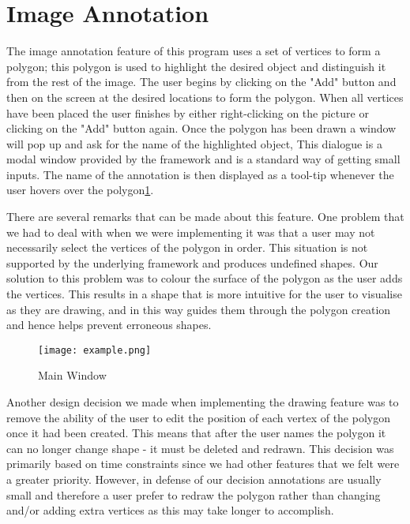\section{Image Annotation}
The image annotation feature of this program uses a set of vertices to form a polygon; this polygon is used to highlight the desired object and distinguish it from the rest of the image. The user begins by clicking on the "Add" button and then on the screen at the desired locations to form the polygon. When all vertices have been placed the user finishes by either right-clicking on the picture or clicking on the "Add" button again.  Once the polygon has been drawn a window will pop up and ask for the name of the highlighted object, This dialogue is a modal window provided by the framework and is a standard way of getting small inputs. The name of the annotation is then displayed as a tool-tip whenever the user hovers over the polygon\ref{fig:fullView}.

There are several remarks that can be made about this feature. One problem that we had to deal with when we were implementing it was that a user may not necessarily select the vertices of the polygon in order. This situation is not supported by the underlying framework and produces undefined shapes. Our solution to this problem was to colour the surface of the polygon as the user adds the vertices. This results in a shape that is more intuitive for the user to visualise as they are drawing, and in this way guides them through the polygon creation and hence helps prevent erroneous shapes.


\begin{figure}[h!]
\centering
\texttt{[image: example.png]}
\label{fig:fullView}
\caption{Main Window}
\end{figure}

Another design decision we made when implementing the drawing feature was to remove the ability of the user to edit the position of each vertex of the polygon once it had been created. This means that after the user names the polygon it can no longer change shape - it must be deleted and redrawn. This decision was primarily based on time constraints since we had other features that we felt were a greater priority.  However, in defense of our decision annotations are usually small and therefore a user prefer to redraw the polygon rather than changing and/or adding extra vertices as this may take longer to accomplish.